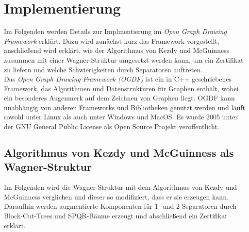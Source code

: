 \chapter{Implementierung}
\label{cha:implementierung}

Im Folgenden werden Details zur Implmentierung im \emph{Open Graph Drawing Framework} erklärt.
Dazu wird zunächst kurz das Framework vorgestellt, anschließend wird erklärt, wie der Algorithmus von Kezdy und McGuinness zusammen mit einer Wagner-Struktur umgesetzt werden kann, um ein Zertifikat zu liefern und welche Schwierigkeiten durch Separatoren auftreten.
\ \\

Das \emph{Open Graph Drawing Framework (OGDF)} ist ein in C++ geschriebenes Framework, das Algorithmen und Datenstrukturen für Graphen enthält, wobei ein besonderes Augenmerk auf dem Zeichnen von Graphen liegt.
OGDF kann unabhängig von anderen Frameworks und Bibliotheken genutzt werden und läuft sowohl unter Linux als auch unter Windows und MacOS.
Es wurde 2005 unter der GNU General Public License als Open Source Projekt veröffentlicht\cite{OGDFAbout}\cite{CGJK+2014}.

\section{Algorithmus von Kezdy und McGuinness als Wagner-Struktur}
Im Folgenden wird die Wagner-Struktur mit dem Algorithmus von Kezdy und McGuinness verglichen und dieser so modifiziert, dass er sie erzeugen kann.
Daraufhin werden augmentierte Komponenten für $1$- und $2$-Separatoren durch Block-Cut-Trees und SPQR-Bäume erzeugt und abschließend ein Zertifikat erklärt.

